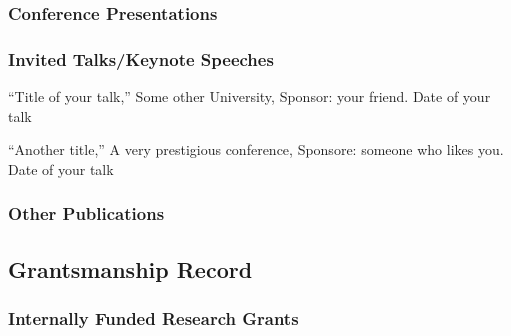 \subsubsection{Conference Presentations}

\subsubsection{Invited Talks/Keynote Speeches}
\begin{revouterenum}
\item ``Title of your talk,'' Some other University,
  Sponsor: your friend. Date of your talk
\item ``Another title,'' A very prestigious conference, Sponsore: someone who
  likes you. Date of your talk
\end{revouterenum}

\subsubsection{Other Publications}



\subsection{Grantsmanship Record}


\subsubsection{Internally Funded Research Grants}

